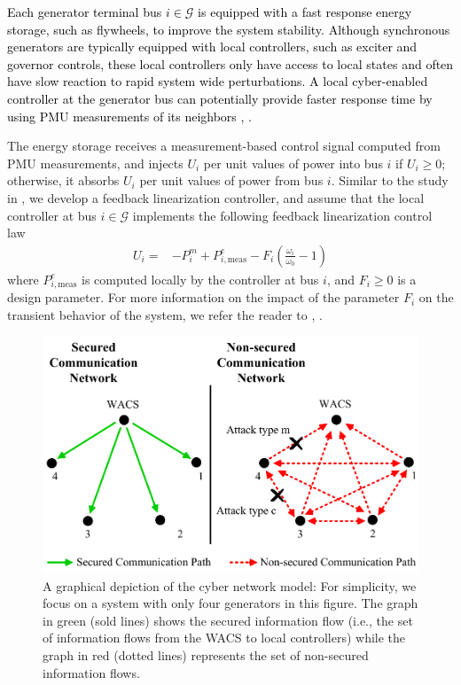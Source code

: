 \textcolor{black}{Each generator terminal bus $i\in\mathcal{G}$ is equipped with a fast response energy storage, such as flywheels, to improve the system stability. Although synchronous generators are typically equipped with local controllers, such as exciter and governor controls, these local controllers only have access to local states and often have slow reaction to rapid system wide perturbations. A local cyber-enabled controller at the generator bus can potentially provide faster response time by using PMU
measurements of its neighbors \cite{facts_storage2}, \cite{facts_storage21}.}

The energy storage receives a measurement-based control signal computed from PMU measurements, and injects $U_i$ per unit values of power into bus $i$ if $U_i\ge0$; otherwise, it absorbs $U_i$ per unit values of power from bus $i$. Similar to the study in \cite{facts_storage2}, we develop a feedback linearization controller, and assume that the local controller at bus $i\in\mathcal{G}$ implements the following feedback linearization control law
\begin{align}\label{Eq:Ui}
U_i = & - P^m_{i} + P_{i,\text{meas}}^e - F_i \left(\frac{\omega_i}{\omega_0} - 1 \right)
\end{align}
where $P_{i,\text{meas}}^e$ is computed locally by the controller at bus $i$, and $F_i \geq 0$ is a design parameter. For more information on the impact of the parameter $F_i$ on the transient behavior of the system, we refer the reader to \cite{facts_storage2}, \cite{facts_storage21}.


\begin{figure}
\centering
\includegraphics[scale=0.6]{chapters/se_nonlinear/figures/Comm_Net} \caption{A graphical depiction of the cyber network model: For simplicity, we focus on a system with only four generators in this figure. The graph in green (sold lines) shows the secured information flow (i.e., the set of information flows from the WACS to local controllers) while the graph in red (dotted lines) represents the set of non-secured information flows.}
\label{wacs}
\end{figure}

